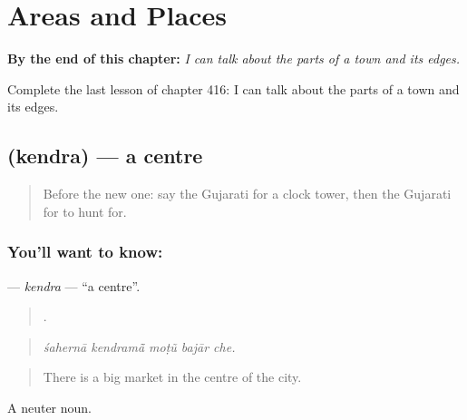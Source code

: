 
\chapter{Areas and Places}
\label{ch:gu-areas-and-places}

\begin{chapteropening}
\textbf{By the end of this chapter:} \emph{I can talk about the parts of a town and its edges.}

Complete the last lesson of chapter 416: I can talk about the parts of a town and its edges.
\end{chapteropening}

\section[\texorpdfstring{\gu{કેન્દ્ર} (kendra)}{કેન્દ્ર (kendra)}]{ (kendra) — a centre}

\label{lesson:GU-C416-kendra}



\begin{quote}
Before the new one: say the Gujarati for a clock tower, then the Gujarati for to hunt for.
\end{quote}

\subsection*{You'll want to know: }
\textbf{} — \emph{kendra} — \textquotedblleft{}a centre\textquotedblright{}.

\begin{quote}
    .
\end{quote}

\begin{quote}
\emph{śahernā kendramā̃ moṭũ bajār che.}
\end{quote}

\begin{quote}
There is a big market in the centre of the city.
\end{quote}

A neuter noun.


